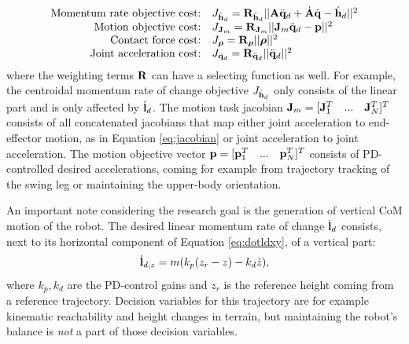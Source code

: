 \begin{equation*}
\begin{array}{rlcl}
$Momentum rate objective cost:$ & J_{\dot{\vect{h}}_d}= \wght_{\dot{\vect{h}}_d}||\matr{A}\ddqjntd + \dot{\matr{A}}\dqjnt - \dot{\vect{h}}_d||^2\\
$Motion objective cost:$ & J_{\matr{J}_m} = \wght_{\matr{J}_m}||\matr{J}_m\ddqjntd-\vect{p}||^2\\
$Contact force cost:$ & J_{\bs{\rho}}=\wght_{\bs{\rho}}||\bs{\rho}||^2 \\
$Joint acceleration cost:$ & J_{\ddqjntd} = \wght_{\ddqjntd}||\ddqjntd ||^2 \\
\end{array}
\end{equation*}
where the weighting terms $\mathbf{R}$ can have a selecting function as well. For example, the centroidal momentum rate of change objective $J_{\dot{\mathbf{h}}_d}$ only consists of the linear part and is only affected by $\dot{\mathbf{l}}_d$. The motion task jacobian $\mathbf{J}_m = [\mathbf{J}_1^T\quad...\quad\mathbf{J}_N^T]^T$ consists of all concatenated jacobians that map either joint acceleration to end-effector motion, as in Equation \eqref{eq:jacobian} or joint acceleration to joint acceleration. The motion objective vector $\mathbf{p} = [\mathbf{p}_1^T\quad...\quad\mathbf{p}_N^T]^T$  consists of PD-controlled desired accelerations, coming for example from trajectory tracking of the swing leg or maintaining the upper-body orientation. %

An important note considering the research goal is the generation of vertical \ac{CoM} motion of the robot. The desired linear momentum rate of change $\dot{\mathbf{l}}_d$ consists, next to its horizontal component of Equation \eqref{eq:dotldxy}, of a vertical part:
\begin{equation}
\dot{\mathbf{l}}_{d,z} =m(k_p(z_r-z) - k_d\dot{z}), 
\label{eq:defaultheightcontrol}
\end{equation}
where $k_p, k_d$ are the PD-control gains and $z_r$ is the reference height coming from a reference trajectory. Decision variables for this trajectory are for example kinematic reachability and height changes in terrain, but maintaining the robot's balance is \textit{not } a part of those decision variables.


